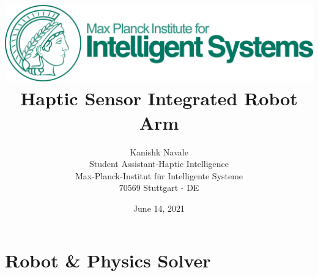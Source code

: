 \documentclass[12pt]{article}
\begin{document}
\title{
    \includegraphics[scale=0.125]{logo.jpg}\\
    \vspace*{6cm}
    Haptic Sensor Integrated Robot Arm\\
    \vspace*{6cm}}

\author{Kanishk Navale\\Student Assistant-Haptic Intelligence\\Max-Planck-Institut für Intelligente Systeme\\70569 Stuttgart - DE}
\date{June 14, 2021}

\maketitle
\pagebreak

\tableofcontents
\listoffigures
\pagebreak

\section{Robot \& Physics Solver}
\end{document}
